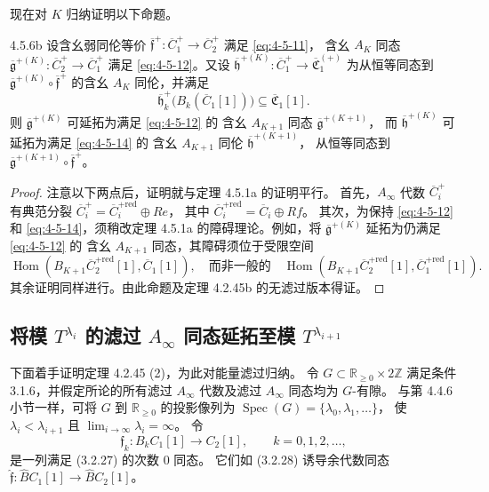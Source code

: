 现在对 $K$ 归纳证明以下命题。
\begin{proposition}{4.5.6b}\label{prop:4-5-6b}
设含幺弱同伦等价
$\overline{\mathfrak f}^{+}\colon
\overline C_1^+\to\overline C_2^+$
满足 \eqref{eq:4-5-11}，
含幺 $A_K$ 同态
$\overline{\mathfrak g}^{+(K)}\colon
\overline C_2^+\to\overline C_1^+$
满足 \eqref{eq:4-5-12}。又设
$\overline{\mathfrak h}^{+(K)}\colon
\overline C_1^+\to\overline{\mathfrak C}_1^{(+)}$
为从恒等同态到
$\overline{\mathfrak g}^{+(K)}
\circ\overline{\mathfrak f}^{+}$
的含幺 $A_K$ 同伦，并满足
\begin{equation}
 \overline{\mathfrak h}^{+}_k
 \bigl(B_k(\overline C_1[1])\bigr)
 \subseteq\overline{\mathfrak C}_1[1].
\tag{4.5.14}\label{eq:4-5-14}
\end{equation}
则 $\overline{\mathfrak g}^{+(K)}$
可延拓为满足 \eqref{eq:4-5-12} 的
含幺 $A_{K+1}$ 同态
$\overline{\mathfrak g}^{+(K+1)}$，
而 $\overline{\mathfrak h}^{+(K)}$
可延拓为满足 \eqref{eq:4-5-14} 的
含幺 $A_{K+1}$ 同伦
$\overline{\mathfrak h}^{+(K+1)}$，
从恒等同态到
$\overline{\mathfrak g}^{+(K+1)}
\circ\overline{\mathfrak f}^{+}$。
\end{proposition}
\begin{proof}
注意以下两点后，证明就与定理 4.5.1a 的证明平行。
首先，$A_\infty$ 代数
$\overline C_i^+$ 有典范分裂
$\overline C_i^+
=\overline C_i^{+\mathrm{red}}\oplus Re$，
其中
$\overline C_i^{+\mathrm{red}}
=\overline C_i\oplus Rf$。
其次，为保持 \eqref{eq:4-5-12}
和 \eqref{eq:4-5-14}，须稍改定理
4.5.1a 的障碍理论。例如，将
$\overline{\mathfrak g}^{+(K)}$
延拓为仍满足 \eqref{eq:4-5-12} 的
含幺 $A_{K+1}$ 同态，其障碍须位于受限空间
\[
 \operatorname{Hom}
 (B_{K+1}\overline C_2^{+\mathrm{red}}[1],
 \overline C_1[1]),
 \quad\text{而非一般的}\quad
 \operatorname{Hom}
 (B_{K+1}\overline C_2^{+\mathrm{red}}[1],
 \overline C_1^{+\mathrm{red}}[1]).
\]
其余证明同样进行。由此命题及定理 4.2.45b 的无滤过版本得证。
\end{proof}

\subsection{将模 $T^{\lambda_i}$ 的滤过 $A_\infty$ 同态延拓至模 $T^{\lambda_{i+1}}$}
\label{subsec:4-5-4}

下面着手证明定理 4.2.45 (2)，为此对能量滤过归纳。
令 $G\subset\mathbb R_{\ge0}\times2\mathbb Z$
满足条件 3.1.6，并假定所论的所有滤过 $A_\infty$
代数及滤过 $A_\infty$ 同态均为 $G$-有隙。
与第 4.4.6 小节一样，可将 $G$ 到
$\mathbb R_{\ge0}$ 的投影像列为
$\operatorname{Spec}(G)=\{\lambda_0,\lambda_1,\ldots\}$，
使 $\lambda_i<\lambda_{i+1}$ 且
$\lim_{i\to\infty}\lambda_i=\infty$。
令
\[
 \mathfrak f_k\colon B_k C_1[1]\to C_2[1],
 \qquad k=0,1,2,\ldots,
\]
是一列满足 (3.2.27) 的次数 $0$ 同态。
它们如 (3.2.28) 诱导余代数同态
$\widehat{\mathfrak f}\colon
\widehat B C_1[1]\to\widehat B C_2[1]$。

